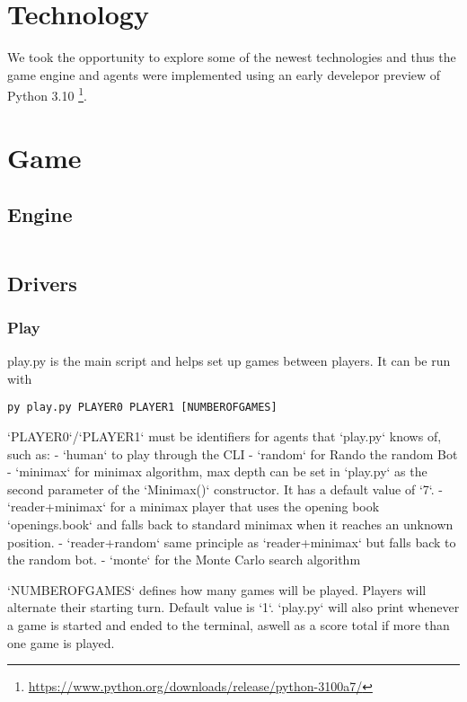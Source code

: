 \section{Technology}
We took the opportunity to explore some of the newest technologies
and thus the game engine and agents were implemented using an early develepor preview of Python 3.10
\footnote{\url{https://www.python.org/downloads/release/python-3100a7/}}.

\section{Game}

\subsection{Engine}

\begin{lstlisting}[language=Python]
\end{lstlisting}

\subsection{Drivers}
\subsubsection{Play}
play.py is the main script and helps set up games between players.
It can be run with

\lstinline{py play.py PLAYER0 PLAYER1 [NUMBEROFGAMES]}

`PLAYER0`/`PLAYER1` must be identifiers for agents that `play.py` knows of, such as:
- `human` to play through the CLI
- `random` for Rando the random Bot
- `minimax` for minimax algorithm, max depth can be set in `play.py` as the second parameter of the `Minimax()` constructor. It has a default value of `7`.
- `reader+minimax` for a minimax player that uses the opening book `openings.book` and falls back to standard minimax when it reaches an unknown position.
- `reader+random` same principle as `reader+minimax` but falls back to the random bot.
- `monte` for the Monte Carlo search algorithm

`NUMBEROFGAMES` defines how many games will be played. Players will alternate their starting turn. Default value is `1`.
`play.py` will also print whenever a game is started and ended to the terminal, aswell as a score total if more than one game is played.

